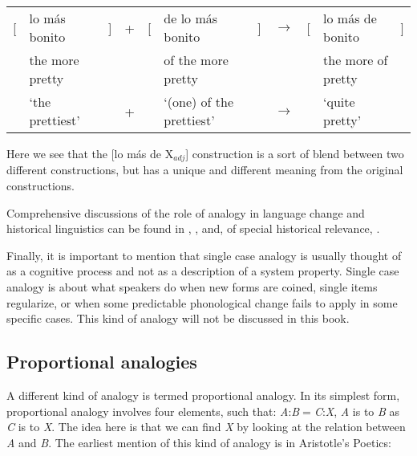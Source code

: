 
\newcommand{\spacebr}{\hspaceThis{[}}

\begin{exe}
    \ex \label{analoy-change-syntax-spanish}
    \setlength\tabcolsep{2pt} %
    \begin{tabular}[t]{l@{}l@{}lcl@{}l@{}lcl@{}l@{}l}
     [ & lo más bonito   & ] & + & [ & de lo más bonito         & ] & $\rightarrow$ & [ & lo más de bonito   & ] \\
       & the more pretty &   &   &   & of the more pretty       &   &               &   & the more of pretty &   \\
       & `the prettiest' &   & + &   & `(one) of the prettiest' &   & $\rightarrow$ &   & `quite pretty'     &   \\
    \end{tabular}
\end{exe}

Here we see that the [lo más de X$_{adj}$] construction is a sort of blend between two different constructions, but has a unique and different meaning from the original constructions.

Comprehensive discussions of the role of analogy in language change and historical linguistics can be found in \textcite{Anttila.2003}, \textcites{Hock.1991, Hock.2003}, \textcite{Trask.1996} and, of special historical relevance, \textcite{Paul.1995}.

Finally, it is important to mention that single case analogy is usually thought of as a cognitive process and not as a description of a system property. Single case analogy is about what speakers do when new forms are coined, single items regularize, or when some predictable phonological change fails to apply in some specific cases. This kind of analogy will not be discussed in this book.

\subsection{Proportional analogies}


\largerpage 
A different kind of analogy is termed proportional analogy. In its simplest form, proportional analogy involves four elements, such that: \textit{A}:\textit{B}$=$\textit{C}:\textit{X}, \textit{A} is to \textit{B} as \textit{C} is to \textit{X}. The idea here is that we can find \textit{X} by looking at the relation between \textit{A} and \textit{B}. The earliest mention of this kind of analogy is in Aristotle's Poetics:

